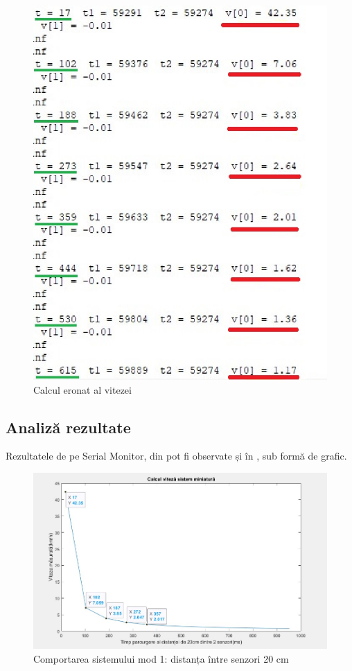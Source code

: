   \begin{figure}[!ht]
    \begin{center}
    \includegraphics[width=0.585\linewidth,keepaspectratio]{pics/speed.jpg}
    \end{center}
    \caption{Calcul eronat al vitezei}
    \label{fig:speed}
\end{figure}


\subsection{Analiză rezultate} \label{fail}

Rezultatele de pe Serial Monitor, din  pot fi observate și în , sub formă de grafic. 

\begin{figure}[!ht]
    \begin{center}
    \includegraphics[width=0.9\linewidth,keepaspectratio]{pics/v1.jpg}
    \end{center}
    \caption{Comportarea sistemului mod 1: distanța între senzori 20 cm}
    \label{fig:v1}
\end{figure}

